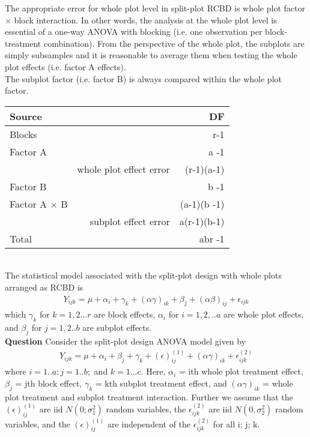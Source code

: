 The appropriate error for whole plot level in split-plot RCBD is whole plot factor $\times$ block interaction. In other words, the analysis at the whole plot level is essential of a one-way ANOVA with blocking (i.e. one observation per block-treatment combination). From the perspective of the whole plot, the subplots are simply subsamples and it is reasonable to average them when testing the whole plot effects (i.e. factor A effects).\\
The subplot factor (i.e. factor B) is always compared within the whole plot factor. \\
\begin{tabular}{l r r}
Source & & DF  \\\hline
Blocks &  &r-1\\
Factor 	A & & a -1\\
 & whole plot effect error  & (r-1)(a-1)\\
Factor B & & b -1\\
Factor A $\times$ B &  & (a-1)(b -1)\\
 & subplot effect error  & a(r-1)(b-1)\\
Total &   & abr -1\\
\hline
\end{tabular}\\
The statistical model associated with the split-plot design with whole plots arranged as RCBD is 
\begin{align*}
Y_{ijk} = \mu + \alpha_i + \gamma_k + (\alpha\gamma)_{ik} + \beta_j + (\alpha\beta)_{ij} + \epsilon_{ijk}
\end{align*}
which $\gamma_k$ for $k=1,2...r$ are block effects, $\alpha_i$ for $i=1,2,.. a$ are whole plot effects, and $\beta_j$ for $j=1,2..b$ are subplot effects. \\

\textbf{Question} Consider the split-plot design ANOVA model given by
\begin{align*}
Y_{ijk} = \mu + \alpha_i + \beta_j + \gamma_k  + (\epsilon)_{ij}^{(1)}  + (\alpha\gamma)_{ik}+ \epsilon_{ijk}^{(2)}
\end{align*}
where $i = 1.. a; j = 1.. b;$ and $k = 1... c$. Here, $\alpha_i$ = ith whole plot treatment effect, $\beta_j$ = jth block effect, $\gamma_k$ = kth subplot treatment effect, and $(\alpha\gamma)_{ik}$ = whole plot treatment and subplot treatment interaction. Further we assume that the $(\epsilon)_{ij}^{(1)}$ are iid $N(0; \sigma_1^2)$ random variables, the $\epsilon_{ijk}^{(2)}$ are iid $N(0, \sigma_2^2)$ random variables, and the $(\epsilon)_{ij}^{(1)}$ are independent of the $\epsilon_{ijk}^{(2)}$ for all i; j; k.\\

